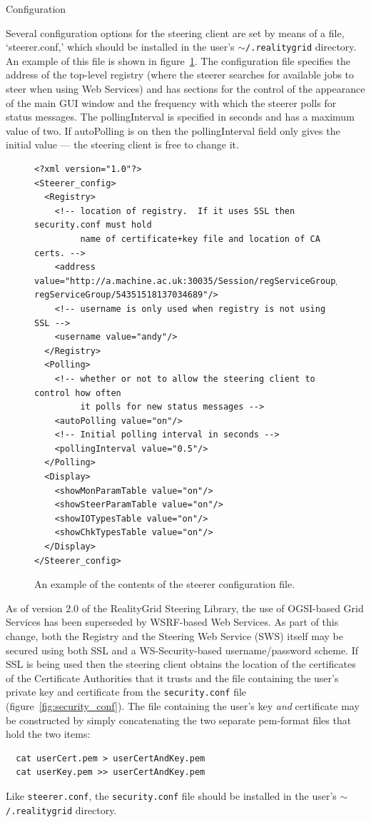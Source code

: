 \documentclass[a4paper,twoside]{article}
\begin{document}
\begin{section}{Configuration}
\label{sec:config}

Several configuration options for the steering client are set by means
of a file, `steerer.conf,' which should be installed in the user's
\texttt{$\sim$/.realitygrid} directory. An example of this file is
shown in figure~\ref{fig:steerer_conf}.  The configuration file
specifies the address of the top-level registry (where the steerer
searches for available jobs to steer when using Web Services) and has
sections for the control of the appearance of the main GUI window and
the frequency with which the steerer polls for status messages.  The
pollingInterval is specified in seconds and has a maximum value of
two. If autoPolling is on then the pollingInterval field only gives
the initial value --- the steering client is free to change it.

\begin{figure}[h]
\begin{verbatim}<?xml version="1.0"?>
<Steerer_config>
  <Registry>
    <!-- location of registry.  If it uses SSL then security.conf must hold
         name of certificate+key file and location of CA certs. -->
    <address value="http://a.machine.ac.uk:30035/Session/regServiceGroup/
regServiceGroup/54351518137034689"/>
    <!-- username is only used when registry is not using SSL -->
    <username value="andy"/>
  </Registry>
  <Polling>
    <!-- whether or not to allow the steering client to control how often
         it polls for new status messages -->
    <autoPolling value="on"/>
    <!-- Initial polling interval in seconds -->
    <pollingInterval value="0.5"/>
  </Polling>
  <Display>
    <showMonParamTable value="on"/>
    <showSteerParamTable value="on"/>
    <showIOTypesTable value="on"/>
    <showChkTypesTable value="on"/>
  </Display>
</Steerer_config>
\end{verbatim}
\caption{An example of the contents of the steerer configuration file.}
\label{fig:steerer_conf}
\end{figure}

As of version 2.0 of the RealityGrid Steering Library, the use of
OGSI-based Grid Services has been superseded by WSRF-based Web
Services.  As part of this change, both the Registry and the Steering
Web Service (SWS) itself may be secured using both SSL and a
WS-Security-based username/password scheme. If SSL is being used then
the steering client obtains the location of the certificates of the
Certificate Authorities that it trusts and the file containing the
user's private key and certificate from the \texttt{security.conf}
file (figure~\ref{fig:security_conf}). The file containing the user's
key {\em and} certificate may be constructed by simply concatenating
the two separate pem-format files that hold the two items:
\begin{verbatim}
  cat userCert.pem > userCertAndKey.pem
  cat userKey.pem >> userCertAndKey.pem
\end{verbatim}
Like \texttt{steerer.conf}, the \texttt{security.conf} file should be
installed in the user's \texttt{$\sim$/.realitygrid} directory.


\end{section}
\end{document}
